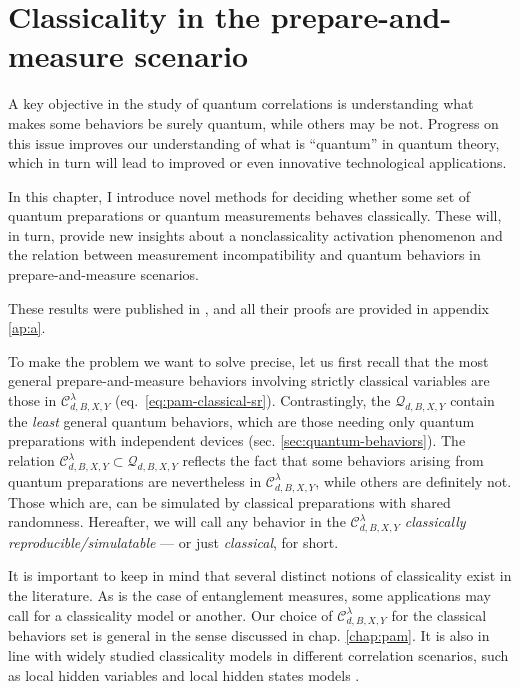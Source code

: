 \chapter{Classicality in the prepare-and-measure scenario}
\label{chap:pam-classical}

    A key objective in the study of quantum correlations is understanding what makes some behaviors be surely quantum, while others may be not. Progress on this issue improves our understanding of what is ``quantum'' in quantum theory, which in turn will lead to improved or even innovative technological applications.

    In this chapter, I introduce novel methods for deciding whether some set of quantum preparations or quantum measurements behaves classically. These will, in turn, provide new insights about a nonclassicality activation phenomenon and the relation between measurement incompatibility and quantum behaviors in prepare-and-measure scenarios.

    These results were published in \cite{degois_2021_general}, and all their proofs are provided in appendix \ref{ap:a}.

    \ornamentbreak

    To make the problem we want to solve precise, let us first recall that  the most general prepare-and-measure behaviors involving strictly classical variables are those in $\mathcal{C}^\lambda_{d,B,X,Y}$ (eq.~\eqref{eq:pam-classical-sr}).  Contrastingly, the $\mathcal{Q}_{d,B,X,Y}$ contain the \emph{least} general quantum behaviors, which are those needing only quantum preparations with independent devices (sec. \ref{sec:quantum-behaviors}). The relation $\mathcal{C}_{d,B,X,Y}^\lambda \subset \mathcal{Q}_{d,B,X,Y}$  reflects the fact that some behaviors arising from quantum preparations are nevertheless in $\mathcal{C}_{d,B,X,Y}^\lambda$, while others are definitely not. Those which are, can be simulated by classical preparations with shared randomness. Hereafter, we will call any behavior in the $\mathcal{C}^\lambda_{d,B,X,Y}$ \emph{classically reproducible/simulatable} --- or just \emph{classical}, for short.

    It is important to keep in mind that several distinct notions of classicality exist in the literature. As is the case of entanglement measures, some applications may call for a classicality model or another. Our choice of $\mathcal{C}_{d,B,X,Y}^\lambda$ for the classical behaviors set is general in the sense discussed in chap. \ref{chap:pam}. It is also in line with widely studied classicality models in different correlation scenarios, such as local hidden variables and local hidden states models \cite{brunner_2014_nonlocality,uola_2020_steering,cavalcanti_2016_steering}.

